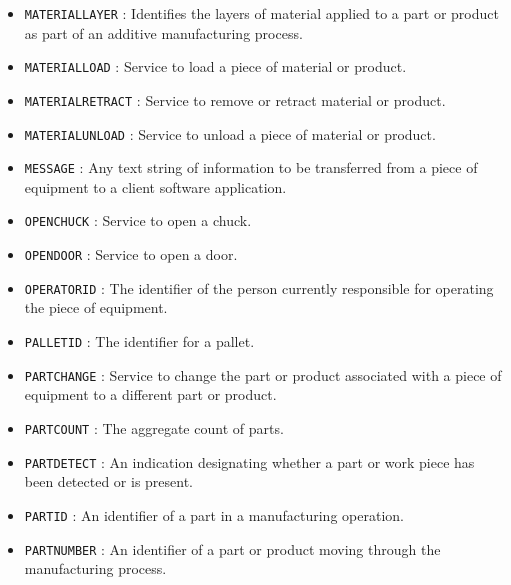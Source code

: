 \begin{itemize}
\item \texttt{MATERIAL\textunderscore LAYER} : Identifies the layers of material applied to a part or product as part of an additive manufacturing process. 

\item \texttt{MATERIAL\textunderscore LOAD} : Service to load a piece of material or product. 

\item \texttt{MATERIAL\textunderscore RETRACT} : Service to remove or retract material or product. 

\item \texttt{MATERIAL\textunderscore UNLOAD} : Service to unload a piece of material or product. 

\item \texttt{MESSAGE} : Any text string of information to be transferred from a piece of equipment to a client software application. 

\item \texttt{OPEN\textunderscore CHUCK} : Service to open a chuck. 

\item \texttt{OPEN\textunderscore DOOR} : Service to open a door. 

\item \texttt{OPERATOR\textunderscore ID} : The identifier of the person currently responsible for operating the piece of equipment. 

\item \texttt{PALLET\textunderscore ID} : The identifier for a pallet. 

\item \texttt{PART\textunderscore CHANGE} : Service to change the part or product associated with a piece of equipment to a different part or product. 

\item \texttt{PART\textunderscore COUNT} : The aggregate count of parts. 

\item \texttt{PART\textunderscore DETECT} : An indication designating whether a part or work piece has been detected or is present. 

\item \texttt{PART\textunderscore ID} : An identifier of a part in a manufacturing operation. 

\item \texttt{PART\textunderscore NUMBER} : An identifier of a part or product moving through the manufacturing process. 


\end{itemize}
